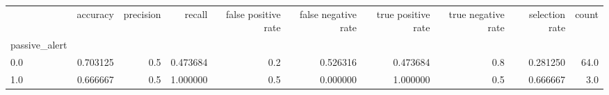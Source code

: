 \begin{tabular}{lrrrrrrrrr}
\toprule
{} &  accuracy &  precision &    recall &  false positive rate &  false negative rate &  true positive rate &  true negative rate &  selection rate &  count \\
passive\_alert &           &            &           &                      &                      &                     &                     &                 &        \\
\midrule
0.0           &  0.703125 &        0.5 &  0.473684 &                  0.2 &             0.526316 &            0.473684 &                 0.8 &        0.281250 &   64.0 \\
1.0           &  0.666667 &        0.5 &  1.000000 &                  0.5 &             0.000000 &            1.000000 &                 0.5 &        0.666667 &    3.0 \\
\bottomrule
\end{tabular}
